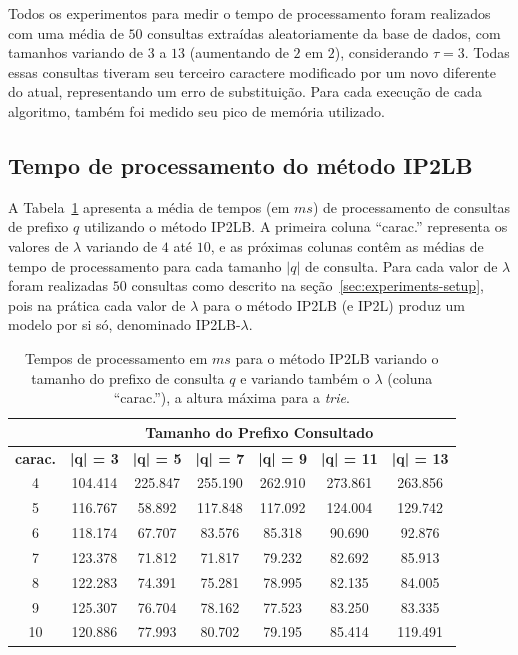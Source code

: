 Todos os experimentos para medir o tempo de processamento foram realizados com uma média de $50$ consultas extraídas aleatoriamente da base de dados, com tamanhos variando de $3$ a $13$ (aumentando de $2$ em $2$), considerando $\tau=3$. Todas essas consultas tiveram seu terceiro caractere modificado por um novo diferente do atual, representando um erro de substituição. Para cada execução de cada algoritmo, também foi medido seu pico de memória utilizado.

\subsection{Tempo de processamento do método IP2LB}

A Tabela~\ref{tab:metodo-performance} apresenta a média de tempos (em $ms$) de processamento de consultas de prefixo $q$ utilizando o método IP2LB. A primeira coluna ``carac.'' representa os valores de $\lambda$ variando de $4$ até $10$, e as próximas colunas contêm as médias de tempo de processamento para cada tamanho $|q|$ de consulta. Para cada valor de $\lambda$ foram realizadas $50$ consultas como descrito na seção~\ref{sec:experiments-setup}, pois na prática cada valor de $\lambda$ para o método IP2LB (e IP2L) produz um modelo por si só, denominado IP2LB-$\lambda$.

\begin{table}[h]
\centering
\begin{tabular}{c|c|c|c|c|c|c|}
\cline{2-7}
 & \multicolumn{6}{c|}{\textbf{Tamanho do Prefixo Consultado}} \\ \hline
\multicolumn{1}{|c|}{\textbf{carac.}} & \textbf{|q| = 3} & \textbf{|q| = 5} & \textbf{|q| = 7} & \textbf{|q| = 9} & \textbf{|q| = 11} & \textbf{|q| = 13} \\ \hline
\multicolumn{1}{|c|}{4} & 104.414 & 225.847 & 255.190 & 262.910 & 273.861 & 263.856 \\ \hline
\multicolumn{1}{|c|}{5} & 116.767 & 58.892 & 117.848 & 117.092 & 124.004 & 129.742 \\ \hline
\multicolumn{1}{|c|}{6} & 118.174 & 67.707 & 83.576 & 85.318 & 90.690 & 92.876 \\ \hline
\multicolumn{1}{|c|}{7} & 123.378 & 71.812 & 71.817 & 79.232 & 82.692 & 85.913 \\ \hline
\multicolumn{1}{|c|}{8} & 122.283 & 74.391 & 75.281 & 78.995 & 82.135 & 84.005 \\ \hline
\multicolumn{1}{|c|}{9} & 125.307 & 76.704 & 78.162 & 77.523 & 83.250 & 83.335 \\ \hline
\multicolumn{1}{|c|}{10} & 120.886 & 77.993 & 80.702 & 79.195 & 85.414 & 119.491 \\ \hline
\end{tabular}
\caption{Tempos de processamento em $ms$ para o método IP2LB variando o tamanho do prefixo de consulta $q$ e variando também o $\lambda$ (coluna ``carac.''), a altura máxima para a \textit{trie}.}
\label{tab:metodo-performance}
\end{table}

